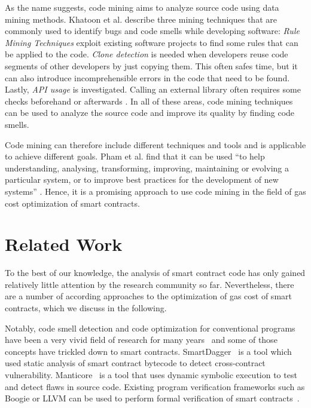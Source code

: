 \documentclass[10pt,conference]{IEEEtran}
\begin{document}
	As the name suggests, code mining aims to analyze source code using data mining methods. Khatoon et al. describe three mining techniques that are commonly used to identify bugs and code smells while developing software: \textit{Rule Mining Techniques} exploit existing software projects to find some rules that can be applied to the code. \textit{Clone detection} is needed when developers reuse code segments of other developers by just copying them. This often safes time, but it can also introduce incomprehensible errors in the code that need to be found. Lastly, \textit{API usage} is investigated. Calling an external library often requires some checks beforehand or afterwards \cite{khatoon}. In all of these areas, code mining techniques can be used to analyze the source code and improve its quality by finding code smells.
	
	Code mining can therefore include different techniques and tools and is applicable to achieve different goals. Pham et al. find that it can be used “to help understanding, analysing, transforming, improving, maintaining or evolving a particular system, or to improve best practices for the development of new systems” \cite{treemining}. Hence, it is a promising approach to use code mining in the field of gas cost optimization of smart contracts.
	
	\section{Related Work}
	\label{sec:related}
	
	To the best of our knowledge, the analysis of smart contract code has only gained relatively little attention by the research community so far. Nevertheless, there are a number of according approaches to the optimization of gas cost of smart contracts, which we discuss in the following. 
	
	Notably, code smell detection and code optimization for conventional programs have been a very vivid field of research for many years~\cite{codesmellmining} and some of those concepts have trickled down to smart contracts. SmartDagger~\cite{smartdagger} is a tool which used static analysis of smart contract bytecode to detect cross-contract vulnerability. Manticore~\cite{manticore} is a tool that uses dynamic symbolic execution to test and detect flaws in source code. Existing program verification frameworks such as Boogie or LLVM can be used to perform formal verification of smart contracts~\cite{formalverification}.
	
\end{document}
